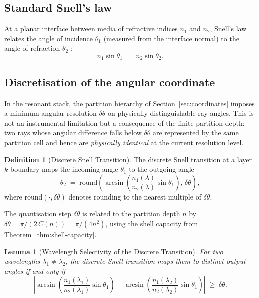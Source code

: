 \documentclass[11pt,twocolumn,a4paper]{article}
\theoremstyle{plain}
\newtheorem{lemma}[theorem]{Lemma}
\theoremstyle{definition}
\newtheorem{definition}[theorem]{Definition}
\theoremstyle{remark}
\begin{document}
\subsection{Standard Snell's law}

At a planar interface between media of refractive indices $n_1$ and $n_2$, Snell's law relates the angle of incidence $\theta_1$ (measured from the interface normal) to the angle of refraction $\theta_2$ \cite{BornWolf1999}:
\begin{equation}
\label{eq:snell}
  n_1\sin\theta_1 \;=\; n_2\sin\theta_2.
\end{equation}

\subsection{Discretisation of the angular coordinate}

In the resonant stack, the partition hierarchy of Section~\ref{sec:coordinates} imposes a minimum angular resolution $\delta\theta$ on physically distinguishable ray angles. This is not an instrumental limitation but a consequence of the finite partition depth: two rays whose angular difference falls below $\delta\theta$ are represented by the same partition cell and hence are \emph{physically identical} at the current resolution level.

\begin{definition}[Discrete Snell Transition]
\label{def:discrete-snell}
The discrete Snell transition at a layer $k$ boundary maps the incoming angle $\theta_1$ to the outgoing angle
\begin{equation}
\label{eq:discrete-snell}
  \theta_2 \;=\; \mathrm{round}\!\left(\arcsin\!\left(\frac{n_1(\lambda)}{n_2(\lambda)}\sin\theta_1\right),\,\delta\theta\right),
\end{equation}
where $\mathrm{round}(\cdot,\delta\theta)$ denotes rounding to the nearest multiple of $\delta\theta$.
\end{definition}

The quantisation step $\delta\theta$ is related to the partition depth $n$ by $\delta\theta = \pi/(2\,C(n)) = \pi/(4n^2)$, using the shell capacity from Theorem~\ref{thm:shell-capacity}.

\begin{lemma}[Wavelength Selectivity of the Discrete Transition]
\label{lem:wavelength-selectivity}
For two wavelengths $\lambda_1\neq\lambda_2$, the discrete Snell transition maps them to distinct output angles if and only if
\begin{equation}
\label{eq:selectivity-condition}
  \left|\arcsin\!\left(\frac{n_1(\lambda_1)}{n_2(\lambda_1)}\sin\theta_1\right) - \arcsin\!\left(\frac{n_1(\lambda_2)}{n_2(\lambda_2)}\sin\theta_1\right)\right| \;\geq\; \delta\theta.
\end{equation}
\end{lemma}
\end{document}
